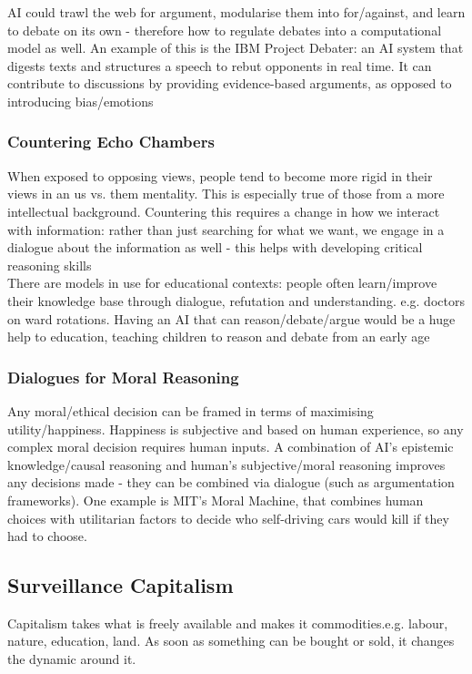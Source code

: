 AI could trawl the web for argument, modularise them into for/against, and learn to debate on its own - therefore how to regulate debates into a computational model as well. An example of this is the IBM Project Debater: an AI system that digests texts and structures a speech to rebut opponents in real time. It can contribute to discussions by providing evidence-based arguments, as opposed to introducing bias/emotions

\subsubsection{Countering Echo Chambers}
When exposed to opposing views, people tend to become more rigid in their views in an us vs. them mentality. This is especially true of those from a  more intellectual background. Countering this requires a change in how we interact with information: rather than just searching for what we want, we engage in a dialogue about the information as well - this helps with developing critical reasoning skills\\

There are models in use for educational contexts: people often learn/improve their knowledge base through dialogue, refutation and understanding. e.g. doctors on ward rotations. Having an AI that can reason/debate/argue would be a huge help to education, teaching children to reason and debate from an early age

\subsubsection{Dialogues for Moral Reasoning}
Any moral/ethical decision can be framed in terms of maximising utility/happiness. Happiness is subjective and based on human experience, so any complex moral decision requires human inputs. A combination of AI's epistemic knowledge/causal reasoning and human's subjective/moral reasoning improves any decisions made - they can be combined via dialogue (such as argumentation frameworks). One example is MIT's Moral Machine, that combines human choices with utilitarian factors to decide who self-driving cars would kill if they had to choose.

\subsection{Surveillance Capitalism}
Capitalism takes what is freely available and makes it commodities.e.g. labour, nature, education, land. As soon as something can be bought or sold, it changes the dynamic around it.\\

